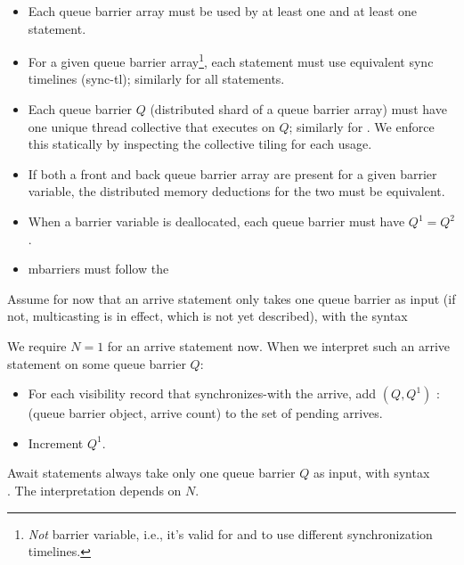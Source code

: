 \filbreak
\begin{itemize}
  \item Each queue barrier array must be used by at least one  and at least one  statement.
  \filbreak
  \item For a given queue barrier array\footnote{\textit{Not} barrier variable, i.e., it's valid for  and  to use different synchronization timelines.}, each  statement must use equivalent sync timelines (sync-tl); similarly for all  statements.
  \filbreak
  \item Each queue barrier $Q$ (distributed shard of a queue barrier array) must have one unique thread collective that executes  on $Q$; similarly for .
    We enforce this statically by inspecting the collective tiling for each usage.
  \filbreak
  \item If both a front and back queue barrier array are present for a given barrier variable, the distributed memory deductions for the two must be equivalent.
  \filbreak
  \item When a barrier variable is deallocated, each queue barrier must have $Q^1 = Q^2$.
  \filbreak
  \item mbarriers must follow the 
\end{itemize}

\filbreak
{}

Assume for now that an arrive statement only takes one queue barrier as input (if not, multicasting is in effect, which is not yet described), with the syntax\\

\filbreak
We require $N = 1$ for an arrive statement now.
When we interpret such an arrive statement on some queue barrier $Q$:
\begin{itemize}
  \item For each visibility record that synchronizes-with the arrive, add $(Q, Q^1)$ : (queue barrier object, arrive count) to the set of pending arrives.
  \item Increment $Q^1$.
\end{itemize}

\filbreak
{}

Await statements always take only one queue barrier $Q$ as input, with syntax\\
.
The interpretation depends on $N$.

